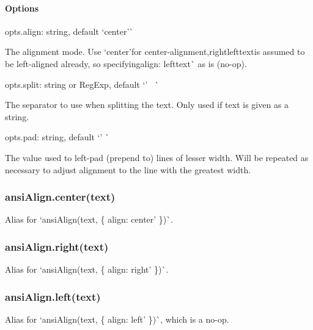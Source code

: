\paragraph*{Options}


\begin{DoxyItemize}
\item {\ttfamily opts.\+align}\+: string, default `\textquotesingle{}center'\`{}

The alignment mode. Use `\textquotesingle{}center'{\ttfamily for center-\/alignment,}\textquotesingle{}right\textquotesingle{}lefttext{\ttfamily is assumed to be left-\/aligned already, so specifying}align\+: \textquotesingle{}lefttext\`{} as is (no-\/op).
\item {\ttfamily opts.\+split}\+: string or Reg\+Exp, default `'~\newline
\textquotesingle{}\`{}

The separator to use when splitting the text. Only used if text is given as a string.
\item {\ttfamily opts.\+pad}\+: string, default `' \textquotesingle{}\`{}

The value used to left-\/pad (prepend to) lines of lesser width. Will be repeated as necessary to adjust alignment to the line with the greatest width.
\end{DoxyItemize}

\subsubsection*{{\ttfamily ansi\+Align.\+center(text)}}

Alias for `ansi\+Align(text, \{ align\+: \textquotesingle{}center' \})\`{}.

\subsubsection*{{\ttfamily ansi\+Align.\+right(text)}}

Alias for `ansi\+Align(text, \{ align\+: \textquotesingle{}right' \})\`{}.

\subsubsection*{{\ttfamily ansi\+Align.\+left(text)}}

Alias for `ansi\+Align(text, \{ align\+: \textquotesingle{}left' \})\`{}, which is a no-\/op.


